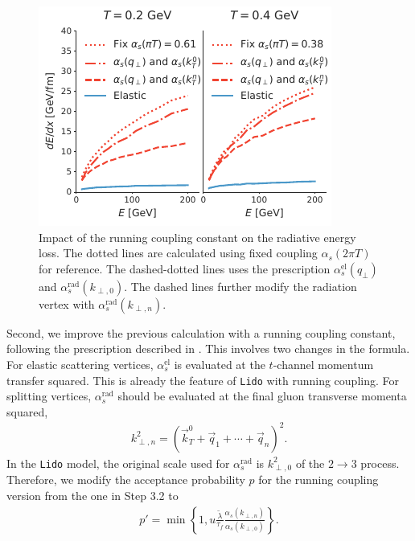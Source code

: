 \documentclass[aps, prc, reprint, amsmath, groupedaddress, nofootinbib]{revtex4-1}
\begin{document}
\begin{figure}
\includegraphics[width=\columnwidth]{Eloss_infinite_run.pdf}
\caption{Impact of the running coupling constant on the radiative energy loss. The dotted lines are calculated using fixed coupling $\alpha_s(2\pi T)$ for reference. The dashed-dotted lines uses the prescription $\alpha_s^{\textrm{el}}(q_\perp)$ and $\alpha_s^{\textrm{rad}}(k_{\perp,0})$. The dashed lines further modify the radiation vertex with $\alpha_s^{\textrm{rad}}(k_{\perp,n})$.}
\label{fig:run}
\end{figure}
Second, we improve the previous calculation with a running coupling constant, following the prescription described in \cite{Arnold:2008zu}.
This involves two changes in the formula. 
For elastic scattering vertices, $\alpha_s^{\textrm{el}}$ is evaluated at the $t$-channel momentum transfer squared. 
This is already the feature of {\tt Lido} with running coupling.
For splitting vertices,  $\alpha_s^{\textrm{rad}}$ should be evaluated at the final gluon transverse momenta squared,
\begin{eqnarray}\label{eq:kTn}
k_{\perp,n}^2 = \left(\vec{k}_T^0+\vec{q}_1+\cdots+\vec{q}_n\right)^2.
\end{eqnarray} 
In the {\tt Lido} model, the original scale used for $\alpha_s^{\textrm{rad}}$ is $k_{\perp,0}^2$ of the $2\rightarrow 3$ process.
Therefore, we modify the acceptance probability $p$ for the running coupling version from the one in Step 3.2 to
\begin{eqnarray}
p' = \min\left\{1, u\frac{\tilde{\lambda}}{\tau_f}\frac{\alpha_s(k_{\perp,n})}{\alpha_s(k_{\perp,0})}\right\}.
\end{eqnarray}
\end{document}
